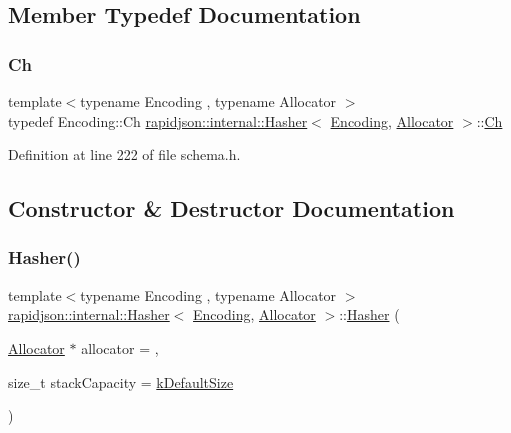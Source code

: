 \subsection{Member Typedef Documentation}
\mbox{\label{classrapidjson_1_1internal_1_1_hasher_ae583d393fe48a90f9369f1fb5e488ab9}} 
\subsubsection{\texorpdfstring{Ch}{Ch}}
{\footnotesize\ttfamily template$<$typename Encoding , typename Allocator $>$ \\
typedef Encoding\+::\+Ch \mbox{\hyperlink{classrapidjson_1_1internal_1_1_hasher}{rapidjson\+::internal\+::\+Hasher}}$<$ \mbox{\hyperlink{classrapidjson_1_1_encoding}{Encoding}}, \mbox{\hyperlink{classrapidjson_1_1_allocator}{Allocator}} $>$\+::\mbox{\hyperlink{classrapidjson_1_1internal_1_1_hasher_ae583d393fe48a90f9369f1fb5e488ab9}{Ch}}}



Definition at line 222 of file schema.\+h.



\subsection{Constructor \& Destructor Documentation}
\mbox{\label{classrapidjson_1_1internal_1_1_hasher_aa4c5e8b9b7c8702f65a2a0e0b8343f4e}} 
\subsubsection{\texorpdfstring{Hasher()}{Hasher()}}
{\footnotesize\ttfamily template$<$typename Encoding , typename Allocator $>$ \\
\mbox{\hyperlink{classrapidjson_1_1internal_1_1_hasher}{rapidjson\+::internal\+::\+Hasher}}$<$ \mbox{\hyperlink{classrapidjson_1_1_encoding}{Encoding}}, \mbox{\hyperlink{classrapidjson_1_1_allocator}{Allocator}} $>$\+::\mbox{\hyperlink{classrapidjson_1_1internal_1_1_hasher}{Hasher}} (\begin{DoxyParamCaption}\item[{\mbox{\hyperlink{classrapidjson_1_1_allocator}{Allocator}} $\ast$}]{allocator = {},  }\item[{size\+\_\+t}]{stack\+Capacity = {\ttfamily \mbox{\hyperlink{classrapidjson_1_1internal_1_1_hasher_aeb47a8003b45accc29ad48ecf137965a}{k\+Default\+Size}}} }\end{DoxyParamCaption})}



